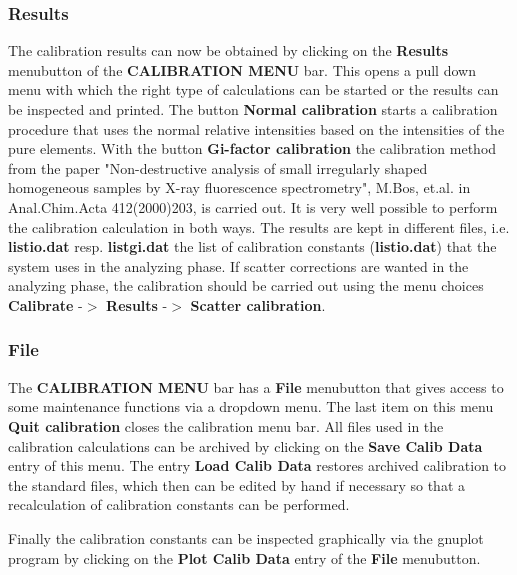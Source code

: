 \subsubsection{Results}
The calibration results can now be obtained by clicking on 
the {\bf Results} menubutton of the {\bf CALIBRATION MENU} bar.
This opens a pull down menu with which the right type of calculations
 can be started or  the
results can be inspected and printed. The button {\bf Normal calibration}
starts a calibration procedure that uses the normal relative intensities
based on the intensities of the pure elements. With the button
{\bf Gi-factor calibration} the calibration method from the paper
"Non-destructive analysis of small irregularly shaped homogeneous
samples by X-ray fluorescence spectrometry", M.Bos, et.al. in
Anal.Chim.Acta 412(2000)203, is carried out. It is very well possible
to perform the calibration calculation in both ways. The results
are kept in different files, i.e. {\bf listio.dat} resp. {\bf listgi.dat}
the list of calibration constants ({\bf listio.dat}) that the
system uses in the analyzing phase. If scatter corrections are wanted in the
analyzing phase, the calibration should be carried out using the menu choices
{\bf Calibrate} -$>$ {\bf Results} -$>$ {\bf Scatter calibration}.

\subsubsection{File}
The {\bf CALIBRATION MENU} bar has a {\bf File} menubutton that gives
access to some maintenance functions via a dropdown menu.
The last item on this menu {\bf Quit calibration} closes the calibration
menu bar. All files used in the calibration calculations can be archived
by clicking on the {\bf Save Calib Data} entry of this menu.
The entry {\bf Load Calib Data} restores archived calibration
to the standard files, which then can be edited by hand if necessary
so that a recalculation of calibration constants can be performed.

Finally the calibration constants can be inspected graphically
via the gnuplot program by clicking on the {\bf Plot Calib Data} entry
of the {\bf File} menubutton.


